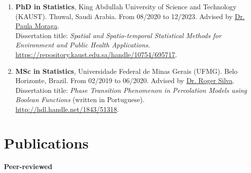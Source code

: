 \documentclass[10pt, ]{article}
\begin{document}
	\begin{enumerate}[noitemsep, topsep=0pt]
		\item \textbf{PhD in Statistics}, King Abdullah University of Science and Technology (KAUST). Thuwal, Saudi Arabia. From 08/2020 to 12/2023. Advised by \href{https://www.paulamoraga.com/}{Dr. Paula Moraga}. %
		\\
		Dissertation title: \textit{Spatial and Spatio-temporal Statistical Methods for Environment and Public Health Applications}. \href{https://repository.kaust.edu.sa/handle/10754/695717}{\url{https://repository.kaust.edu.sa/handle/10754/695717}}.  \vspace{3pt}
		
		\item \textbf{MSc in Statistics}, Universidade Federal de Minas Gerais (UFMG). Belo Horizonte, Brazil. From 02/2019 to 06/2020. Advised by \href{http://www.est.ufmg.br/~rogerwcs/}{Dr. Roger Silva}. %
		\\
		Dissertation title: \textit{Phase Transition Phenomenon in Percolation Models using Boolean Functions} (written in Portuguese). \href{http://hdl.handle.net/1843/51318}{\url{http://hdl.handle.net/1843/51318}}.
		
		
		
	\end{enumerate}
	
	\vspace{10pt}
	
	\vspace{-12pt}
	
	\section*{Publications} \vspace{-5pt}
	
	\textbf{Peer-reviewed} \vspace{-5pt}
	
\end{document}
